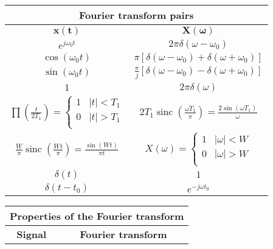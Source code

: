 \documentclass[en]{article}
\DeclareMathOperator{\sinc}{sinc}
\begin{document}
\begin{center}
    \renewcommand{\arraystretch}{1.5}
    \begin{tabular}{|c|c|}
        \multicolumn{2}{c}{{\bf Fourier transform pairs }} \\
        \hline
        $\mathbf{x(t)}$ & $\mathbf{X(\omega)}$ \\
        \hline
        $e^{j\omega_0 t }$ & $2\pi\delta (\omega-\omega_0)$ \\
        \hline
        $\cos(\omega_0 t)$ & $\pi \left [ \delta(\omega-\omega_0 ) + \delta(\omega+\omega_0 ) \right ]$\\
        \hline
        $\sin(\omega_0 t)$ & $\displaystyle\frac{\pi}{j} \left [ \delta(\omega-\omega_0 ) - \delta(\omega+\omega_0 ) \right ]$\\
        \hline
        $1$ & $2\pi\delta(\omega)$ \\
        \hline
        $\prod \left ( \displaystyle\frac{t}{2T_1}\right ) = \left \{ \begin{array}{lc} 1 & |t| < T_1 \\ 0 & |t| >T_1 \\ \end{array} \right.$ & $2 T_1 \sinc\left ( \displaystyle\frac{\omega T_1}{\pi} \right ) = \displaystyle\frac{2 \sin(\omega T_1)}{\omega}$ \\
        \hline 
        $\displaystyle\frac{W}{\pi} \sinc\left ( \displaystyle\frac{Wt}{\pi} \right ) = \displaystyle\frac{\sin(Wt)}{\pi t}$ & $X(\omega) = \left \{ \begin{array}{lc} 1 & |\omega| < W \\ 0 & |\omega| >W \\ \end{array} \right. $ \\ 
        \hline 
        $\delta(t)$ & $1$ \\
        \hline
        $\delta(t-t_0)$ & $e^{-j \omega t_0}$ \\
        \hline
    \end{tabular}
    \renewcommand{\arraystretch}{1}
    \vspace{0.5cm}
    \renewcommand{\arraystretch}{1.5}
    \begin{tabular}{|c|c|}
        \multicolumn{2}{c}{{\bf Properties of the Fourier transform }} \\
        \hline
        {\bf Signal} & {\bf Fourier transform} \\
        \hline

\end{tabular}
\end{center}
\end{document}
